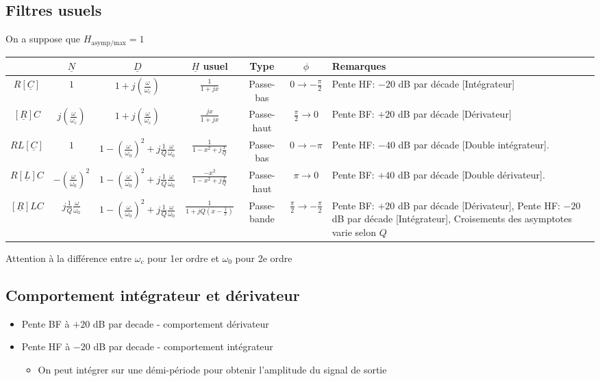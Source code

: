 \documentclass[openany]{book}
\begin{document}
\subsection{Filtres usuels}
On a suppose que $H_{\text{asymp/max}} = 1$
\scriptsize
\begin{center}
    \renewcommand{\arraystretch}{2}
\begin{tabular}{ |c|c|c|c|c|c|m{5cm}| } 
     \hline
      & $ \underline{N} $ & $ \underline{D} $ & $\underline{H}$ usuel & Type & $ \phi $ & Remarques  \\ 
     \hline \hline
     $R[\underline{C}]$ & $ 1 $ & $ 1 + j(\frac{\omega}{\omega_c}) $ & $ \frac{1}{1 + jx} $ & Passe-bas & $ 0 \rightarrow -\frac{\pi}{2} $ & Pente HF: $-20$ dB par décade [Intégrateur] \\
     \hline
     $[\underline{R}]C$ & $ j(\frac{\omega}{\omega_c}) $ & $ 1 + j(\frac{\omega}{\omega_c}) $ & $ \frac{jx}{1 + jx} $ & Passe-haut & $ \frac{\pi}{2} \rightarrow 0 $ & Pente BF: $+20$ dB par décade [Dérivateur] \\
     \hline
     $RL[\underline{C}]$ & $ 1 $ & $ 1 - (\frac{\omega}{\omega_0})^2 + j\frac{1}{Q}\frac{\omega}{\omega_0} $ & $ \frac{1}{1 - x^2 +  j\frac{x}{Q}} $ & Passe-bas & $ 0 \rightarrow -\pi $ & Pente HF: $-40$ dB par décade [Double intégrateur]. \\
     \hline
     $R[\underline{L}]C$ & $ -(\frac{\omega}{\omega_0}) ^2$ & $ 1 - (\frac{\omega}{\omega_0})^2 + j\frac{1}{Q}\frac{\omega}{\omega_0} $ & $ \frac{-x^2}{1 - x^2 +  j\frac{x}{Q}} $ & Passe-haut & $ \pi \rightarrow 0 $ & Pente BF: $+40$ dB par décade [Double dérivateur]. \\
     \hline
     $[\underline{R}]LC$ & $ j\frac{1}{Q}\frac{\omega}{\omega_0} $ & $ 1 - (\frac{\omega}{\omega_0})^2 + j\frac{1}{Q}\frac{\omega}{\omega_0} $ & $ \frac{1}{1+jQ(x-\frac{1}{x})} $ & Passe-bande & $ \frac{\pi}{2} \rightarrow -\frac{\pi}{2} $ & Pente BF: $+20$ dB par décade [Dérivateur], Pente HF: $-20$ dB par décade [Intégrateur], Croisements des asymptotes varie selon $Q$  \\
     \hline
\end{tabular}
\end{center}
\normalsize

\noindent Attention à la différence entre $\omega_c$ pour 1er ordre et $\omega_0$ pour 2e ordre

\subsection{Comportement intégrateur et dérivateur}
\begin{itemize}
    \item Pente BF à $+20$ dB par decade - comportement dérivateur
    \item Pente HF à $-20$ dB par decade - comportement intégrateur
    \begin{itemize}
        \item On peut intégrer sur une démi-période pour obtenir l'amplitude du signal de sortie 
    \end{itemize}
\end{itemize}
\end{document}
